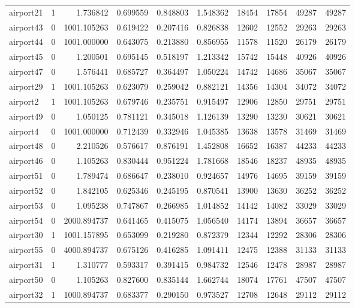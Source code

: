 \begin{longtable}{|l|r|r|r|r|r|r|r|r|r|}
airport21 & 1 & 1.736842 & 0.699559 & 0.848803 & 1.548362 & 18454 & 17854 & 49287 & 49287 \\
airport43 & 0 & 1001.105263 & 0.619422 & 0.207416 & 0.826838 & 12602 & 12552 & 29263 & 29263 \\
airport44 & 0 & 1001.000000 & 0.643075 & 0.213880 & 0.856955 & 11578 & 11520 & 26179 & 26179 \\
airport45 & 0 & 1.200501 & 0.695145 & 0.518197 & 1.213342 & 15742 & 15448 & 40926 & 40926 \\
airport47 & 0 & 1.576441 & 0.685727 & 0.364497 & 1.050224 & 14742 & 14686 & 35067 & 35067 \\
airport29 & 1 & 1001.105263 & 0.623079 & 0.259042 & 0.882121 & 14356 & 14304 & 34072 & 34072 \\
airport2 & 1 & 1001.105263 & 0.679746 & 0.235751 & 0.915497 & 12906 & 12850 & 29751 & 29751 \\
airport49 & 0 & 1.050125 & 0.781121 & 0.345018 & 1.126139 & 13290 & 13230 & 30621 & 30621 \\
airport4 & 0 & 1001.000000 & 0.712439 & 0.332946 & 1.045385 & 13638 & 13578 & 31469 & 31469 \\
airport48 & 0 & 2.210526 & 0.576617 & 0.876191 & 1.452808 & 16652 & 16387 & 44233 & 44233 \\
airport46 & 0 & 1.105263 & 0.830444 & 0.951224 & 1.781668 & 18546 & 18237 & 48935 & 48935 \\
airport51 & 0 & 1.789474 & 0.686647 & 0.238010 & 0.924657 & 14976 & 14695 & 39159 & 39159 \\
airport52 & 0 & 1.842105 & 0.625346 & 0.245195 & 0.870541 & 13900 & 13630 & 36252 & 36252 \\
airport53 & 0 & 1.095238 & 0.747867 & 0.266985 & 1.014852 & 14142 & 14082 & 33029 & 33029 \\
airport54 & 0 & 2000.894737 & 0.641465 & 0.415075 & 1.056540 & 14174 & 13894 & 36657 & 36657 \\
airport30 & 1 & 1001.157895 & 0.653099 & 0.219280 & 0.872379 & 12344 & 12292 & 28306 & 28306 \\
airport55 & 0 & 4000.894737 & 0.675126 & 0.416285 & 1.091411 & 12475 & 12388 & 31133 & 31133 \\
airport31 & 1 & 1.310777 & 0.593317 & 0.391415 & 0.984732 & 12546 & 12478 & 28987 & 28987 \\
airport50 & 0 & 1.105263 & 0.827600 & 0.835144 & 1.662744 & 18074 & 17761 & 47507 & 47507 \\
airport32 & 1 & 1000.894737 & 0.683377 & 0.290150 & 0.973527 & 12708 & 12648 & 29112 & 29112 \\

\end{longtable}

